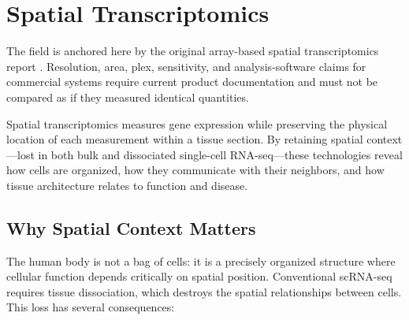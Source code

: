 \chapter{Spatial Transcriptomics}
\label{ch:spatial}

\begin{sourcebox}
The field is anchored here by the original array-based spatial transcriptomics report \cite{stahl2016}. Resolution, area, plex, sensitivity, and analysis-software claims for commercial systems require current product documentation and must not be compared as if they measured identical quantities.
\end{sourcebox}

\begin{keyconcept}
Spatial transcriptomics measures gene expression while preserving the physical
location of each measurement within a tissue section. By retaining spatial
context---lost in both bulk and dissociated single-cell RNA-seq---these
technologies reveal how cells are organized, how they communicate with their
neighbors, and how tissue architecture relates to function and disease.
\end{keyconcept}

\section{Why Spatial Context Matters}
\label{sec:spatial:why}

The human body is not a bag of cells: it is a precisely organized structure
where cellular function depends critically on spatial position. Conventional
scRNA-seq requires tissue dissociation, which destroys the spatial
relationships between cells. This loss has several consequences:

